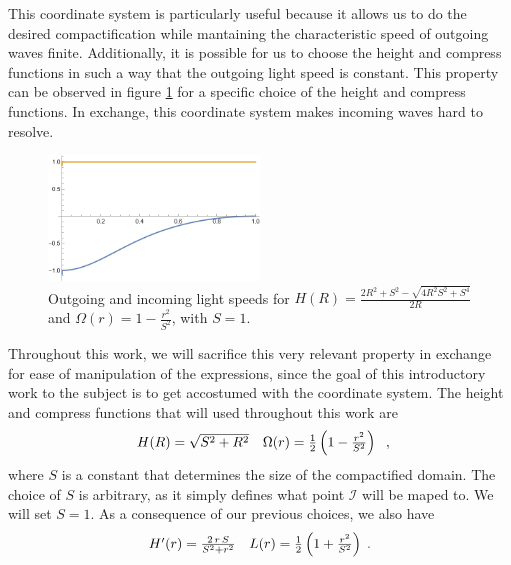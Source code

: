 This coordinate system is particularly useful because it allows us to do the desired compactification while mantaining the characteristic speed of outgoing waves finite. Additionally, it is possible for us to choose the height and compress functions in such a way that the outgoing light speed is constant. This property can be observed in figure \ref{fig:Good_Speeds} for a specific choice of the height and compress functions. In exchange, this coordinate system makes incoming waves hard to resolve. 

\begin{figure}[h]
    \centering
    \includegraphics[width=0.5\textwidth]{Images/Good_Speeds.png}
    \caption{Outgoing and incoming light speeds for $H(R) = \frac{2 R^2 + S^2 - \sqrt{4 R^2 S^2 + S^4}}{2R}$ and $\Omega(r) = 1 - \frac{r^2}{S^2}$, with $S = 1$.}
    \label{fig:Good_Speeds}
\end{figure}

Throughout this work, we will sacrifice this very relevant property in exchange for ease of manipulation of the expressions, since the goal of this introductory work to the subject is to get accostumed with the coordinate system. The height and compress functions that will used throughout this work are
%
\begin{equation}
    \begin{array}{c c}
        H(R) = \sqrt{S^2+R^2} & \Omega(r) = \frac{1}{2} \left(1 - \frac{r^2}{S^2}\right)
    \end{array} \; ,
\end{equation}
%
where $S$ is a constant that determines the size of the compactified domain. The choice of $S$ is arbitrary, as it simply defines what point $\mathscr{I}$ will be maped to. We will set $S = 1$. As a consequence of our previous choices, we also have
%
\begin{equation}
    \begin{array}{c c}
        H'(r) = \frac{2 \, r \, S}{S^2 + r^2} & L(r) = \frac{1}{2} \left(1 + \frac{r^2}{S^2}\right) \; .
    \end{array}
\end{equation}

